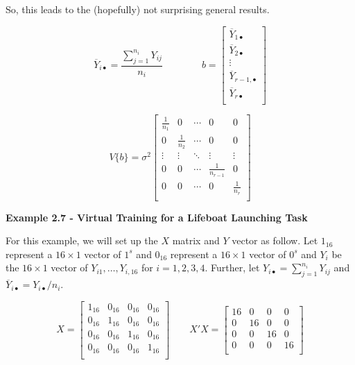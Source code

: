 \documentclass[
]{book}
\begin{document}
So, this leads to the (hopefully) not surprising general results.

\[ 
\overline{Y}_{i\bullet} = \frac{\sum_{j=1}^{n_i}Y_{ij}}{n_i}
\qquad \qquad
b = \begin{bmatrix}
\overline{Y}_{1\bullet} \\ \overline{Y}_{2\bullet} \\ \vdots \\
\overline{Y}_{r-1,\bullet} \\
\overline{Y}_{r\bullet} \\ \end{bmatrix}
\]

\[
V\{b\} = \sigma^2
\begin{bmatrix}
\frac{1}{n_1} & 0 & \cdots & 0 & 0 \\
0 & \frac{1}{n_2} & \cdots & 0 & 0\\ 
\vdots & \vdots & \ddots & \vdots & \vdots \\
0 & 0 & \cdots & \frac{1}{n_{r-1}} & 0 \\
0 & 0 & \cdots & 0 & \frac{1}{n_r}  \\ \end{bmatrix}
\]

\textbf{Example 2.7 - Virtual Training for a Lifeboat Launching Task}

For this example, we will set up the \(X\) matrix and \(Y\) vector as
follow. Let \(1_{16}\) represent a \(16\times 1\) vector of \(1^s\) and
\(0_{16}\) represent a \(16\times 1\) vector of \(0^s\) and \(Y_i\) be
the \(16\times 1\) vector of \(Y_{i1},\ldots,Y_{i,16}\) for
\(i=1,2,3,4\). Further, let \(Y_{i\bullet}=\sum_{j=1}^{n_i}Y_{ij}\) and
\(\overline{Y}_{i\bullet} = Y_{i\bullet}/n_i\).

\[
X = 
\begin{bmatrix}
1_{16} & 0_{16} & 0_{16} & 0_{16}  \\
0_{16} & 1_{16} & 0_{16} & 0_{16}  \\
0_{16} & 0_{16} & 1_{16} & 0_{16}  \\
0_{16} & 0_{16} & 0_{16} & 1_{16}  \\
\end{bmatrix}
\qquad 
X'X = 
\begin{bmatrix}
16 & 0 & 0 & 0 \\
0 & 16 & 0 & 0\\
0 & 0 & 16 & 0 \\
0 & 0 & 0 & 16\\
\end{bmatrix}
\]
\end{document}
